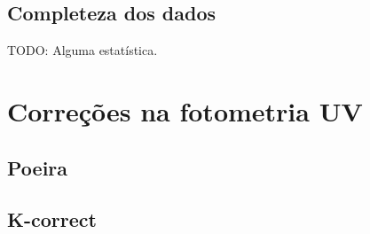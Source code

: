 \subsection{Completeza dos dados}
TODO: Alguma estatística.


\section{Correções na fotometria UV}
\label{sec:Crossmatch:Correcoes}

\subsection{Poeira}

\subsection{K-correct}


